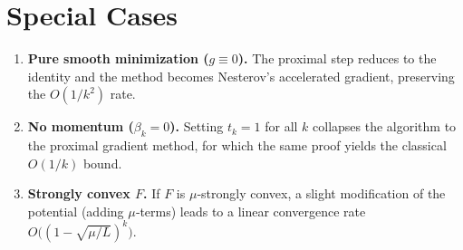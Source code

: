 \documentclass{article}
\begin{document}
\section*{Special Cases}
\begin{enumerate}
\item \textbf{Pure smooth minimization ($g\equiv0$).} The proximal step reduces to the identity and the method becomes Nesterov’s accelerated gradient, preserving the $O(1/k^{2})$ rate.
\item \textbf{No momentum ($\beta_k=0$).} Setting $t_k=1$ for all $k$ collapses the algorithm to the proximal gradient method, for which the same proof yields the classical $O(1/k)$ bound.
\item \textbf{Strongly convex $F$.} If $F$ is $\mu$‑strongly convex, a slight modification of the potential (adding $\mu$‑terms) leads to a linear convergence rate $O\bigl((1-\sqrt{\mu/L})^{k}\bigr)$.
\end{enumerate}
\end{document}
